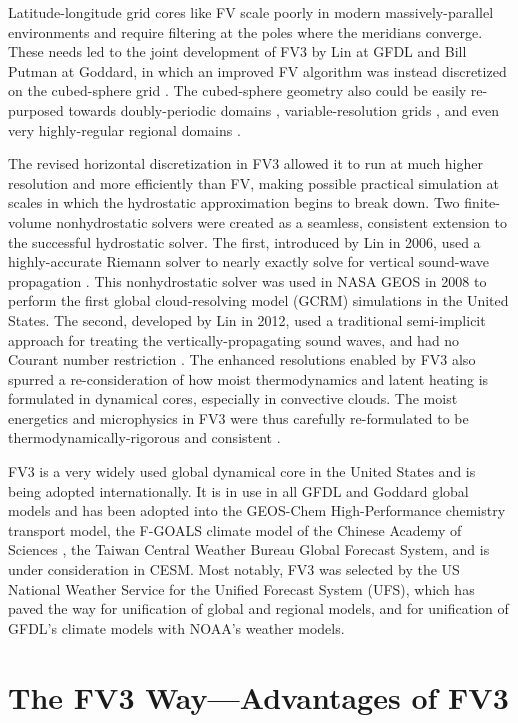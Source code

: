 \documentclass[10pt,letterpaper,margin=1in]{memoir}
\begin{document}
Latitude-longitude grid cores like FV scale poorly in modern massively-parallel environments and require filtering at the poles where the meridians converge. These needs led to the joint development of FV3 by Lin at GFDL and Bill Putman at Goddard, in which an improved FV algorithm was instead discretized on the cubed-sphere grid \citep{PL07}. The cubed-sphere geometry also could be easily re-purposed towards doubly-periodic domains \citep{Held2007,Arnold2018}, variable-resolution grids \citep{HL13,HLT16}, and even very highly-regular regional domains \citep{PurserTong2017}.

The revised horizontal discretization in FV3 allowed it to run at much higher resolution and more efficiently than FV, making possible practical simulation at scales in which the hydrostatic approximation begins to break down. Two finite-volume nonhydrostatic solvers were created as a seamless, consistent extension to the successful hydrostatic solver. The first, introduced by Lin in 2006, used a highly-accurate Riemann solver to nearly exactly solve for vertical sound-wave propagation \citep{XChen2013}. This nonhydrostatic solver was used in NASA GEOS in 2008 to perform the first global cloud-resolving model (GCRM) simulations in the United States.  
The second, developed by Lin in 2012, used a traditional semi-implicit approach for treating the vertically-propagating sound waves, and had no Courant number restriction \citep{Harris2020b}. The enhanced resolutions enabled by FV3 also spurred a re-consideration of how moist thermodynamics and latent heating is formulated in dynamical cores, especially in convective clouds. The moist energetics and microphysics in FV3 were thus carefully re-formulated to be  thermodynamically-rigorous and consistent \citep{ChenLin2013,Zhou2019}. 

FV3 is a very widely used global dynamical core in the United States and is being adopted internationally. It is in use in all GFDL and Goddard global models and has been adopted into the GEOS-Chem High-Performance chemistry transport model, the F-GOALS climate model of the Chinese Academy of Sciences \citep{LiBao2019}, the Taiwan Central Weather Bureau Global Forecast System, and is under consideration in CESM. Most notably, FV3 was selected by the US National Weather Service for the Unified Forecast System (UFS), which has paved the way for unification of global and regional models, and for unification of GFDL's climate models with NOAA's weather models. 

\section{The FV3 Way---Advantages of FV3}
\end{document}
